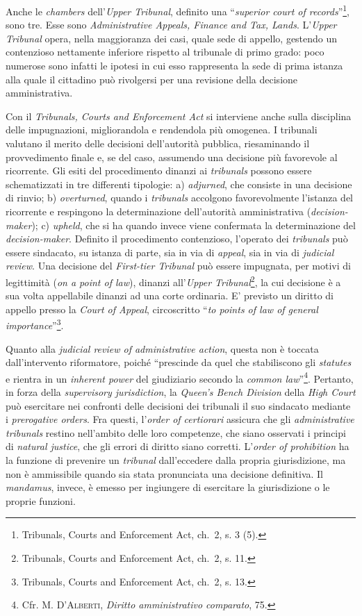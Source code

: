 \documentclass[12pt,it,a4paper,]{report}
\begin{document}
Anche le \emph{chambers} dell'\emph{Upper Tribunal}, definito una
``\emph{superior court of records}''\footnote{Tribunals, Courts and
  Enforcement Act, ch.~2, s. 3 (5).}, sono tre. Esse sono
\emph{Administrative Appeals, Finance and Tax, Lands}. L'\emph{Upper
Tribunal} opera, nella maggioranza dei casi, quale sede di appello,
gestendo un contenzioso nettamente inferiore rispetto al tribunale di
primo grado: poco numerose sono infatti le ipotesi in cui esso
rappresenta la sede di prima istanza alla quale il cittadino può
rivolgersi per una revisione della decisione amministrativa.

Con il \emph{Tribunals, Courts and Enforcement Act} si interviene anche
sulla disciplina delle impugnazioni, migliorandola e rendendola più
omogenea. I tribunali valutano il merito delle decisioni dell'autorità
pubblica, riesaminando il provvedimento finale e, se del caso, assumendo
una decisione più favorevole al ricorrente. Gli esiti del procedimento
dinanzi ai \emph{tribunals} possono essere schematizzati in tre
differenti tipologie: a) \emph{adjurned}, che consiste in una decisione
di rinvio; b) \emph{overturned}, quando i \emph{tribunals} accolgono
favorevolmente l'istanza del ricorrente e respingono la determinazione
dell'autorità amministrativa (\emph{decision-maker}); c) \emph{upheld},
che si ha quando invece viene confermata la determinazione del
\emph{decision-maker}. Definito il procedimento contenzioso, l'operato
dei \emph{tribunals} può essere sindacato, su istanza di parte, sia in
via di \emph{appeal}, sia in via di \emph{judicial review}. Una
decisione del \emph{First-tier Tribunal} può essere impugnata, per
motivi di legittimità (\emph{on a point of law}), dinanzi
all'\emph{Upper Tribunal}\footnote{Tribunals, Courts and Enforcement
  Act, ch.~2, s. 11.}, la cui decisione è a sua volta appellabile
dinanzi ad una corte ordinaria. E' previsto un diritto di appello presso
la \emph{Court of Appeal}, circoscritto ``\emph{to points of law of
general importance}''\footnote{Tribunals, Courts and Enforcement Act,
  ch.~2, s. 13.}.

Quanto alla \emph{judicial review of administrative action}, questa non
è toccata dall'intervento riformatore, poiché ``prescinde da quel che
stabiliscono gli \emph{statutes} e rientra in un \emph{inherent power}
del giudiziario secondo la \emph{common law}''\footnote{Cfr. M.
  \textsc{D'Alberti}, \emph{Diritto amministrativo comparato}, 75.}.
Pertanto, in forza della \emph{supervisory jurisdiction}, la
\emph{Queen's Bench Division} della \emph{High Court} può esercitare nei
confronti delle decisioni dei tribunali il suo sindacato mediante i
\emph{prerogative orders}. Fra questi, l'\emph{order of certiorari}
assicura che gli \emph{administrative tribunals} restino nell'ambito
delle loro competenze, che siano osservati i principi di \emph{natural
justice}, che gli errori di diritto siano corretti. L'\emph{order of
prohibition} ha la funzione di prevenire un \emph{tribunal}
dall'eccedere dalla propria giurisdizione, ma non è ammissibile quando
sia stata pronunciata una decisione definitiva. Il \emph{mandamus},
invece, è emesso per ingiungere di esercitare la giurisdizione o le
proprie funzioni.
\end{document}
